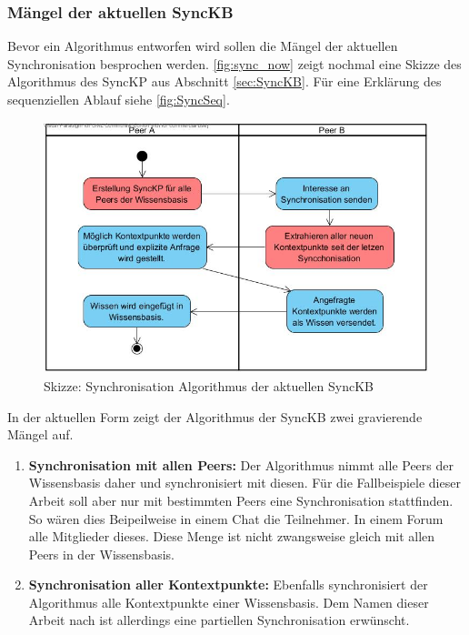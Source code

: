 \documentclass[a4paper]{article}
\begin{document}
	\subsubsection{Mängel der aktuellen SyncKB}
	
	Bevor ein Algorithmus entworfen wird sollen die Mängel der aktuellen 
	Synchronisation besprochen werden. \autoref{fig:sync_now} zeigt nochmal eine
	Skizze des Algorithmus des SyncKP aus Abschnitt \ref{sec:SyncKB}. Für 
	eine Erklärung des sequenziellen Ablauf siehe \autoref{fig:SyncSeq}.
	
	\begin{figure}[H]
		\centerline{
			\includegraphics[scale=0.495]{../Bilder/sync_flaws.jpg}
		}
		\caption{Skizze: Synchronisation Algorithmus der aktuellen SyncKB}
		\label{fig:sync_now}
	\end{figure}
	
	In der aktuellen Form zeigt der Algorithmus der SyncKB zwei gravierende Mängel
	auf.
	
	\begin{enumerate}
		\item \textbf{Synchronisation mit allen Peers:} Der Algorithmus nimmt alle
		Peers der Wissensbasis daher und synchronisiert mit diesen. Für die
		Fallbeispiele dieser Arbeit soll aber nur mit bestimmten Peers eine
		Synchronisation stattfinden. So wären dies Beipeilweise in einem Chat die
		Teilnehmer. In einem Forum alle Mitglieder dieses. Diese Menge ist
		nicht zwangsweise gleich mit allen Peers in der Wissensbasis.
		\item \textbf{Synchronisation aller Kontextpunkte:} Ebenfalls
		synchronisiert der Algorithmus alle Kontextpunkte einer Wissensbasis. 
		Dem Namen dieser Arbeit nach ist allerdings eine partiellen Synchronisation
		erwünscht.		
	\end{enumerate}
	
\end{document}
